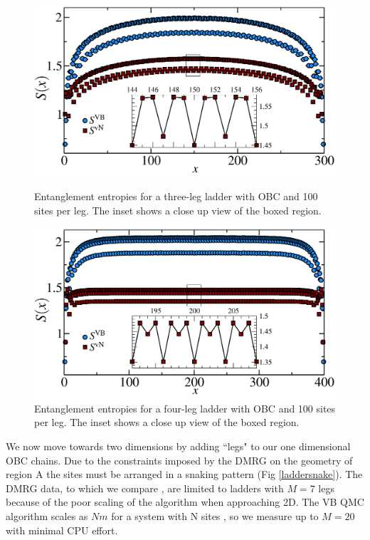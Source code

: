 \begin{figure} { 
\vspace{-1cm}
\includegraphics[width=6in]{./figures/paper1/figure3/3-leg-ladder/fig3_final2.pdf}
\caption[Entanglement entropies for a three-leg ladder]{
Entanglement entropies for a three-leg ladder with OBC and 100 sites per leg.  
The inset shows a close up view of the boxed region.
 \label{ladder3} }
 \vspace{1cm}
 \includegraphics[width=6in]{./figures/paper1/figure3/4-leg-ladder/4legfig.pdf}
\caption[Entanglement entropies for a four-leg ladder]{
Entanglement entropies for a four-leg ladder with OBC and 100 sites per leg.  
The inset shows a close up view of the boxed region.  
 \label{ladder4}}
 
 } 
 \end{figure}
  

 
 We now move towards two dimensions by adding ``legs" to our one dimensional OBC chains.
 Due to the constraints imposed by the DMRG on the geometry of region A the sites must be arranged in a snaking pattern (Fig \ref{laddersnake}).
The DMRG data, to which we compare \vB, are limited to ladders with $M=7$ legs because of the poor scaling of the algorithm when approaching 2D.
 The VB QMC algorithm scales as $Nm$ for a system with N sites \cite{Loops}, so we measure up to $M=20$ with minimal CPU effort.
 

